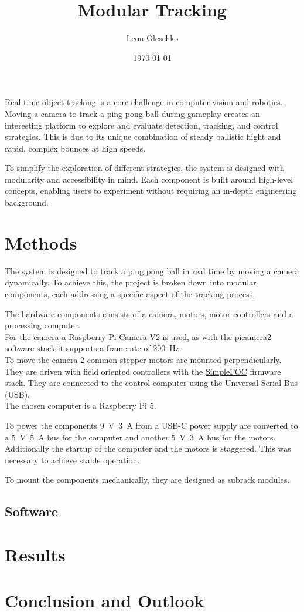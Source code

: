 \documentclass[
    parskip=half, 
    twoside=false,
    twocolumn=true,
    fontsize=12pt,
]{scrarticle}
\begin{document}
\title{Modular Tracking}
\author{Leon Oleschko}
\date{\dotdate\today}
{\sffamily\maketitle}

Real-time object tracking is a core challenge in computer vision and robotics. Moving a camera to track a ping pong ball during gameplay creates an interesting platform to explore and evaluate detection, tracking, and control strategies. This is due to its unique combination of steady ballistic flight and rapid, complex bounces at high speeds.

To simplify the exploration of different strategies, the system is designed with modularity and accessibility in mind. Each component is built around high-level concepts, enabling users to experiment without requiring an in-depth engineering background.


\section{Methods}
The system is designed to track a ping pong ball in real time by moving a camera dynamically. To achieve this, the project is broken down into modular components, each addressing a specific aspect of the tracking process. 

The hardware components consists of a camera, motors, motor controllers and a processing computer.\\
For the camera a Raspberry Pi Camera V2 is used, as with the \href{https://github.com/raspberrypi/picamera2}{picamera2} software stack it supports a framerate of \SI{200}{Hz}.\\
To move the camera 2 common stepper motors are mounted perpendicularly.
They are driven with field oriented controllers with the \href{https://simplefoc.com/}{SimpleFOC} firmware stack.
They are connected to the control computer using the Universal Serial Bus (USB).\\
The chosen computer is a Raspberry Pi 5.

To power the components \SI{9}{V}~\SI{3}{A} from a USB-C power supply are converted to a \SI{5}{V}~\SI{5}{A} bus for the computer and another \SI{5}{V}~\SI{3}{A} bus for the motors.
Additionally the startup of the computer and the motors is staggered.
This was necessary to achieve stable operation.

To mount the components mechanically, they are designed as subrack modules.


\subsection{Software}

\section{Results}

\section{Conclusion and Outlook}
\end{document}
